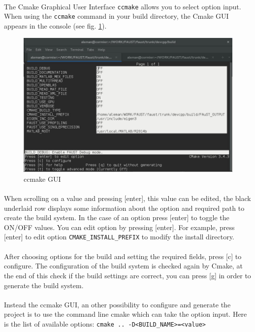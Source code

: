 \paragraph{}The Cmake Graphical User Interface \texttt{ccmake} allows you to select option input. When using the \texttt{ccmake} command in your build directory, the Cmake GUI appears in the console (see fig. \ref{fig:ccmake}).

\begin{figure}[!h] %
\centering
\includegraphics[scale=0.5]{images/ccmake.jpg}
\caption{ccmake GUI}
\label{fig:ccmake}
\end{figure}

\paragraph{}When scrolling on a value and pressing [enter], this value can be edited, the black underlaid row displays some information about the option and required path to create the build system. In the case of an option press [enter] to toggle the ON/OFF values. You can edit option by pressing [enter]. For example, press [enter] to edit option \texttt{CMAKE\_INSTALL\_PREFIX} to modify the install directory. 
\paragraph{}After choosing options for the build and setting the required fields, press [c] to configure. The configuration of the build system is checked again by Cmake, at the end of this check if the build settings are correct, you can press [g] in order to generate the build system.

\paragraph{} Instead the ccmake GUI, an other possibility to configure and generate the project is to use the command line cmake which can take the option input. Here is the list of available options: 
\texttt{cmake\ ..\ -D<BUILD\_NAME>=<value>}

